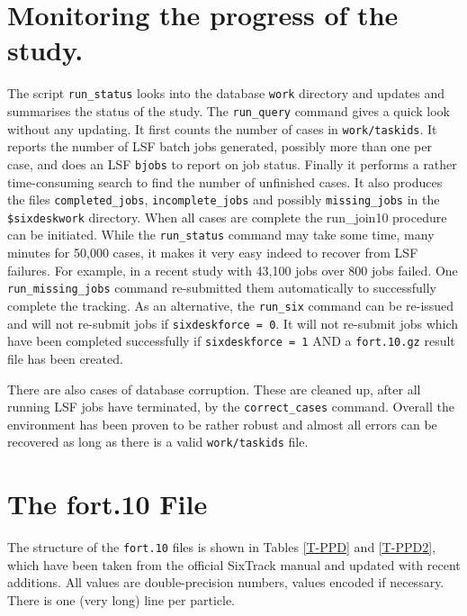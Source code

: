 \documentclass{cernatsnote}    %
\begin{document}
\section{Monitoring the progress of the study.}
\label{sec:status}
The script {\tt run\_status} looks into the database {\tt work} directory and updates and summarises
the status of the study. The {\tt run\_query} command gives a quick look without
any updating. It first counts the number of cases in {\tt work/taskids}.
It reports the number of LSF batch jobs generated, possibly
more than one per case, and does an LSF {\tt bjobs} to report on job status.
Finally it performs a rather time-consuming search to find the number of unfinished cases.
It also produces the files {\tt completed\_jobs}, {\tt incomplete\_jobs}
and possibly {\tt missing\_jobs} in the
{\tt \$sixdeskwork} directory.  When all cases are complete the {run\_join10} procedure can
be initiated. While the {\tt run\_status} command may take some time, many minutes for
50,000 cases, it makes it very easy indeed to recover from LSF failures. For example, in
a recent study with 43,100 jobs over 800 jobs failed. One {\tt run\_missing\_jobs}
command re-submitted them automatically to successfully complete the tracking.  
As an alternative, the {\tt run\_six} command can be re-issued and will not re-submit
jobs if {\tt sixdeskforce = 0}. It will not re-submit jobs which have been completed successfully
if {\tt sixdeskforce = 1} AND a {\tt fort.10.gz} result file has been created.

There are also cases of database corruption. These are cleaned up, after all running LSF jobs
have terminated, by the {\tt correct\_cases} command. Overall the environment has
been proven to be rather robust and almost all errors can be recovered
as long as there is a valid {\tt work/taskids} file.

\section{The fort.10 File}
\label{sec:fort10}
The structure of the {\tt fort.10} files is shown in Tables
\ref{T-PPD} and \ref{T-PPD2}, which have been taken from the official
SixTrack manual \cite{SixTrack} and updated with recent additions.
All values are double-precision numbers, values encoded if necessary.
There is one (very long) line per particle.

 \setcounter{dst}{0}
\end{document}
